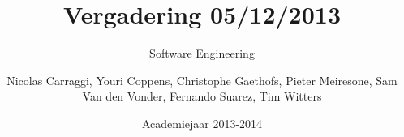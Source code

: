 \author{Nicolas Carraggi, Youri Coppens, Christophe Gaethofs, Pieter Meiresone, Sam Van den Vonder, Fernando Suarez, Tim Witters}
\title{Vergadering 05/12/2013}
\subtitle{Software Engineering} 
\date{Academiejaar 2013-2014}


\makeassignment